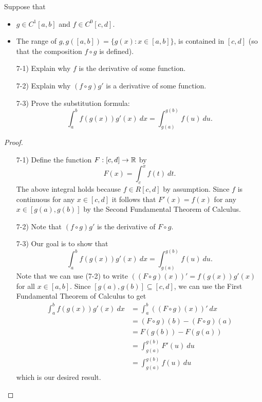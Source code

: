 \documentclass[a4paper]{article}
\begin{document}
\begin{problem}
   Suppose that  
   \begin{itemize}
       \item \( g \in C^{1}[a,b] \) and \( f \in C^{0}[c,d] \).
       \item The range of \( g , g([a,b]) = \{ g(x) : x \in [a,b] \}  \), is contained in \( [c,d] \) (so that the composition \( f \circ g  \) is defined).
   \end{itemize}
   \begin{enumerate}
       \item[7-1)] Explain why \( f  \) is the derivative of some function.
        \item[7-2)] Explain why \( (f \circ g ) g' \) is a derivative of some function.
        \item[7-3)] Prove the substitution formula:
            \[  \int_{ a }^{ b } f(g(x)) g'(x) \ dx = \int_{ g(a) }^{ g(b) }  f(u) \ du.  \]
   \end{enumerate}
\end{problem}
\begin{proof}
\begin{enumerate}
    \item[7-1)] Define the function \( F:[c,d] \to \mathbb{R}  \) by
        \[  F(x) = \int_{ c }^{ x }  f(t) \ dt. \]
        The above integral holds because \( f \in R[c,d] \) by assumption.
        Since \( f  \) is continuous for any \( x \in [c,d] \) it follows that \( F'(x) = f(x) \) for any \( x \in [g(a),g(b)] \) by the Second Fundamental Theorem of Calculus.
    \item[7-2)] Note that \( (f \circ g) g' \) is the derivative of \( F \circ g \). 
    \item[7-3)] Our goal is to show that 
        \[  \int_{ a }^{ b } f(g(x)) g'(x) \ dx = \int_{ g(a) }^{ g(b) } f(u) \ du.\]
        Note that we can use (7-2) to write \( ((F \circ g)(x))' = f(g(x)) g'(x)  \) for all \( x \in [a,b] \). Since \( [g(a), g(b)] \subseteq  [c,d] \), we can use the First Fundamental Theorem of Calculus to get
        \begin{align*}
            \int_{ a }^{ b }  f(g(x)) g'(x) \ dx &= \int_{ a }^{ b }  ((F \circ g) (x))' \ dx  \\
                                                 &= (F \circ  g)(b) - (F \circ g) (a) \\
                                                 &= F(g(b)) - F(g(a)) \\
                                                 &= \int_{ g(a) }^{ g(b) } F'(u) \ du \\
                                                 &= \int_{ g(a) }^{ g(b) } f(u) \ du
        \end{align*}
        which is our desired result.
\end{enumerate}
\end{proof}
\end{document}
